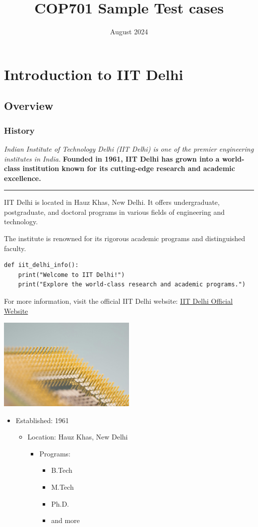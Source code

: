 \documentclass{article}
\title{COP701 Sample Test cases}
\date{August 2024}
\begin{document}
\section{Introduction to IIT Delhi}
\subsection{Overview}
\subsubsection{History}

\textit{Indian Institute of Technology Delhi (IIT Delhi) is one of the premier engineering institutes in India.}
\textbf{Founded in 1961, IIT Delhi has grown into a world-class institution known for its cutting-edge research and academic excellence.}

\hrule

IIT Delhi is located in Hauz Khas, New Delhi. It offers undergraduate, postgraduate, and doctoral programs in various fields of engineering and technology.\par
The institute is renowned for its rigorous academic programs and distinguished faculty.

\begin{verbatim}
def iit_delhi_info():
    print("Welcome to IIT Delhi!")
    print("Explore the world-class research and academic programs.")
\end{verbatim}

For more information, visit the official IIT Delhi website: \href{https://www.iitd.ac.in}{IIT Delhi Official Website}

\includegraphics[width=0.5\textwidth]{images/technology.jpg}

\begin{itemize}
    \item Established: 1961
    \begin{itemize}
        \item Location: Hauz Khas, New Delhi
        \begin{itemize}
            \item Programs: 
                \begin{itemize}
                    \item B.Tech
                    \item M.Tech
                    \item Ph.D.
                    \item and more
                \end{itemize}
        \end{itemize}
    \end{itemize}
\end{itemize}
\end{document}
